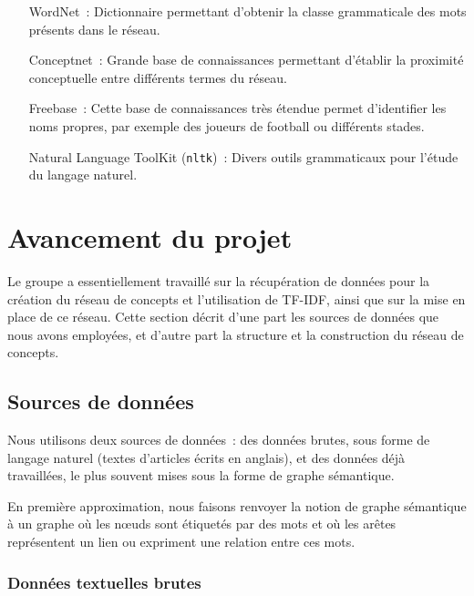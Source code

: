 \documentclass[a4paper, 12pt]{article}
\newcommand{\pyt}[1]{\texttt{#1}}%
\begin{document}
\begin{itemize}
	\item[WordNet~: ]Dictionnaire permettant d'obtenir la classe grammaticale des mots présents dans le réseau.
	\item[Conceptnet~: ]Grande base de connaissances permettant d'établir la proximité conceptuelle entre différents termes du réseau.
	\item[Freebase~: ]Cette base de connaissances très étendue permet d'identifier les noms propres, par exemple des joueurs de football ou différents stades.
	\item[Natural Language ToolKit (\pyt{nltk})~: ]Divers outils grammaticaux pour l'étude du langage naturel.
\end{itemize}



\section{Avancement du projet}

Le groupe a essentiellement travaillé sur la récupération de données pour la création du réseau de concepts et l'utilisation de TF-IDF, ainsi que sur la mise en place de ce réseau. Cette section décrit d'une part les sources de données que nous avons employées, et d'autre part la structure et la construction du réseau de concepts.

\subsection{Sources de données}

Nous utilisons deux sources de données~: des données brutes, sous forme de langage naturel (textes d'articles écrits en anglais), et des données déjà travaillées, le plus souvent mises sous la forme de graphe sémantique.

\begin{definition}
En première approximation, nous faisons renvoyer la notion de graphe sémantique à un graphe où les nœuds sont étiquetés par des mots et où les arêtes représentent un lien ou expriment une relation entre ces mots.
\end{definition}


\subsubsection{Données textuelles brutes}
\end{document}
